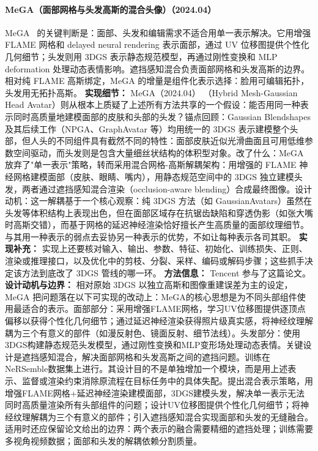 \paragraph{MeGA（面部网格与头发高斯的混合头像）（2024.04）}
MeGA~\cite{2404_19026} 的关键判断是：面部、头发和编辑需求不适合用单一表示解决。它用增强 FLAME 网格和 delayed neural rendering 表示面部，通过 UV 位移图提供个性化几何细节；头发则用 3DGS 表示静态规范模型，再通过刚性变换和 MLP deformation 处理动态表情影响。遮挡感知混合负责面部网格和头发高斯的边界。相对纯 FLAME 高斯绑定，MeGA 的增量是组件化表示选择：脸用可编辑拓扑，头发用无拓扑高斯。
\textbf{实现细节：} MeGA（2024.04） （Hybrid Mesh-Gaussian Head Avatar）则从根本上质疑了上述所有方法共享的一个假设：能否用同一种表示同时高质量地建模面部的皮肤和头部的头发？锚点回顾：Gaussian Blendshapes 及其后续工作（NPGA、GraphAvatar 等）均用统一的 3DGS 表示建模整个头部，但人头的不同组件具有截然不同的特性：面部皮肤近似光滑曲面且可用低维参数空间驱动，而头发则是包含大量细丝状结构的体积型对象。改了什么：MeGA 放弃了"单一表示"策略，转而采用混合网格-高斯解耦架构：用增强的 FLAME 神经网格建模面部（皮肤、眼睛、嘴内），用静态规范空间中的 3DGS 独立建模头发，两者通过遮挡感知混合渲染（occlusion-aware blending）合成最终图像。设计动机：这一解耦基于一个核心观察：纯 3DGS 方法（如 GaussianAvatars）虽然在头发等体积结构上表现出色，但在面部区域存在抗锯齿缺陷和穿透伪影（如张大嘴时高斯交错），而基于网格的延迟神经渲染恰好擅长产生高质量的面部纹理细节。与其用一种表示的弱点去妥协另一种表示的优势，不如让每种表示各司其职。
\textbf{实现补充：} 实现上还要核对输入、输出、参数、特征、初始化、训练损失、正则、渲染或推理接口，以及优化中的剪枝、分裂、采样、编码或解码步骤；这些抓手决定该方法到底改了 3DGS 管线的哪一环。
\textbf{方法信息：} Tencent 参与了这篇论文。
\textbf{设计动机与边界：} 相对原始 3DGS 以独立高斯和图像重建误差为主的设定，MeGA 把问题落在以下可实现的改动上：MeGA的核心思想是为不同头部组件使用最适合的表示。面部部分：采用增强FLAME网格，学习UV位移图提供逐顶点偏移以获得个性化几何细节；通过延迟神经渲染获得照片级真实感，将神经纹理解耦为三个有意义的部件（如漫反射色、镜面反射、细节法线）。头发部分：使用3DGS构建静态规范头发模型，通过刚性变换和MLP变形场处理动态表情。关键设计是遮挡感知混合，解决面部网格和头发高斯之间的遮挡问题。训练在NeRSemble数据集上进行。其设计目的不是单独增加一个模块，而是用上述表示、监督或渲染约束消除原流程在目标任务中的具体失配。提出混合表示策略，用增强FLAME网格+延迟神经渲染建模面部，3DGS建模头发，解决单一表示无法同时高质量渲染所有头部组件的问题；设计UV位移图提供个性化几何细节；将神经纹理解耦为三个有意义的部件；引入遮挡感知混合实现面部和头发的无缝融合。适用时还应保留论文给出的边界：两个表示的融合需要精细的遮挡处理；训练需要多视角视频数据；面部和头发的解耦依赖分割质量。
